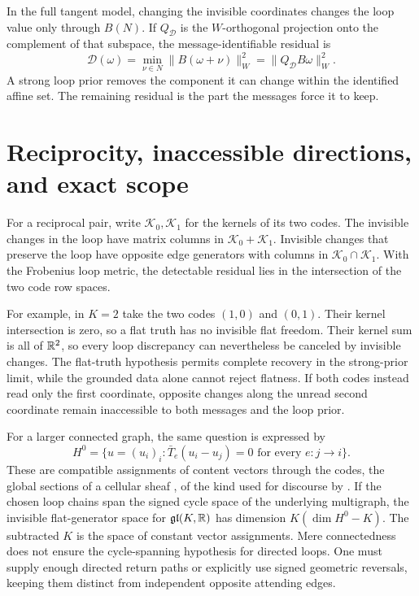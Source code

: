In the full tangent model, changing the invisible coordinates changes the loop value only through $B(N)$. If $Q_{\mathcal D}$ is the $W$-orthogonal projection onto the complement of that subspace, the message-identifiable residual is
\begin{equation}
\mathcal D(\omega)=\min_{\nu\in N}\|B(\omega+\nu)\|_W^2
=\|Q_{\mathcal D}B\omega\|_W^2.
\label{c17:detectable}
\end{equation}
A strong loop prior removes the component it can change within the identified affine set. The remaining residual is the part the messages force it to keep.

\section{Reciprocity, inaccessible directions, and exact scope}

For a reciprocal pair, write $\mathcal K_0,\mathcal K_1$ for the kernels of its two codes. The invisible changes in the loop have matrix columns in $\mathcal K_0+\mathcal K_1$. Invisible changes that preserve the loop have opposite edge generators with columns in $\mathcal K_0\cap\mathcal K_1$. With the Frobenius loop metric, the detectable residual lies in the intersection of the two code row spaces.

For example, in $K=2$ take the two codes $(1,0)$ and $(0,1)$. Their kernel intersection is zero, so a flat truth has no invisible flat freedom. Their kernel sum is all of $\mathbb R^2$, so every loop discrepancy can nevertheless be canceled by invisible changes. The flat-truth hypothesis permits complete recovery in the strong-prior limit, while the grounded data alone cannot reject flatness. If both codes instead read only the first coordinate, opposite changes along the unread second coordinate remain inaccessible to both messages and the loop prior.

For a larger connected graph, the same question is expressed by
\begin{equation}
H^0=\{u=(u_i)_i:\bar T_e(u_i-u_j)=0
\text{ for every }e:j\to i\}.
\label{c17:sections}
\end{equation}
These are compatible assignments of content vectors through the codes, the global sections of a cellular sheaf \citep{HansenGhrist2019}, of the kind used for discourse by \citet{HansenGhrist2021}. If the chosen loop chains span the signed cycle space of the underlying multigraph, the invisible flat-generator space for $\mathfrak{gl}(K,\mathbb R)$ has dimension $K(\dim H^0-K)$. The subtracted $K$ is the space of constant vector assignments. Mere connectedness does not ensure the cycle-spanning hypothesis for directed loops. One must supply enough directed return paths or explicitly use signed geometric reversals, keeping them distinct from independent opposite attending edges.

